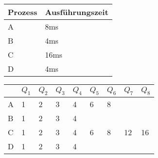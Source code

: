 \documentclass[12pt]{standalone}
\begin{document}
    \begin{tabular}{| l | l |}
        \hline
        Prozess & Ausführungszeit\\
        \hline
        A & 8ms\\
        \hline
        B & 4ms\\
        \hline
        C & 16ms\\
        \hline
        D & 4ms\\
        \hline
    \end{tabular}
    \begin{tabular}{| x{1em} | x{1em} | x{1em} | x{1em} | x{1em} | x{1em} | x{1em} | x{1em} | x{1em} |}
        \hline
        & $Q_1$ & $Q_2$ & $Q_3$ & $Q_4$ & $Q_5$ & $Q_6$ & $Q_7$ & $Q_8$\\
        \hline
        A & 1 & 2 & 3 & 4 & 6 & 8 & &\\
        \hline
        B & 1 & 2 & 3 & 4 & & & &\\
        \hline
        C & 1 & 2 & 3 & 4 & 6 & 8 & 12 & 16\\
        \hline
        D & 1 & 2 & 3 & 4 & & & &\\
        \hline
    \end{tabular}
\end{document}
